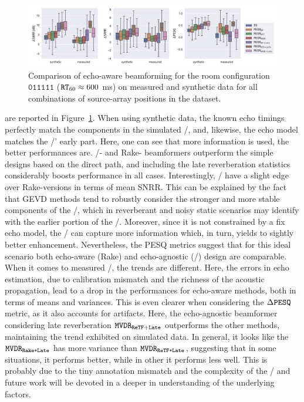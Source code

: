 \begin{figure}[t]
    \begin{fullwidth}
        \centering
        \includegraphics[trim={0 10 10 0},clip,width=\linewidth]{figures/dechorateapp/kowalkzy_results_boxplot.pdf}
        \caption{
        Comparison of echo-aware beamforming for the room configuration $\mathtt{011111}$ ($\mathtt{RT}_{60} \approx 600 $ ms) on measured and synthetic data  for all combinations of source-array positions in the \dEchorate{} dataset.}
        \label{fig:dechorateapp:se:results}
    \end{fullwidth}
\end{figure}

 are reported in Figure~\ref{fig:dechorateapp:se:results}.
When using synthetic data, the known echo timings perfectly match the components in the simulated \RIRs/, and, likewise, the echo model matches the \RIRs/' early part.
Here, one can see that more information is used, the better performances are. \ReTF/- and Rake- beamformers outperform the simple designs based on the direct path, and including the late reverberation statistics considerably boosts performance in all cases.
Interestingly, \ReTF/ have a slight edge over Rake-versions in terms of mean \ac{SNRR}.
This can be explained by the fact that \ac{GEVD} methods tend to robustly consider the stronger and more stable components of the \ReTFs/, which in reverberant and noisy static scenarios may identify with the earlier portion of the \RIRs/.
Moreover, since it is not constrained by a fix echo model, the \ReTFs/ can capture more information which, in turn, yields to sightly better enhancement.
Nevertheless, the \ac{PESQ} metrics suggest that for this ideal scenario  both echo-aware (Rake) and echo-agnostic (\ReTF/) design are comparable.
\\When it comes to measured \RIRs/, the trends are different.
Here, the errors in echo estimation, due to calibration mismatch and the richness of the acoustic propagation, lead to a drop in the performances for echo-aware methods, both in terms of means and variances.
This is even clearer when considering the $\Delta\mathtt{PESQ}$ metric, as it also accounts for artifacts.
Here, the echo-agnostic beamformer considering late reverberation $\mathtt{MVDR}_\mathtt{ReTF+Late}$ outperforms the other methods, maintaining the trend exhibited on simulated data.
In general, it looks like the $\mathtt{MVDR}_\texttt{Rake+Late}$ has more variance than $\mathtt{MVDR}_\texttt{ReTF+Late}$, suggesting that in some situations, it performs better, while in other it performs less well.
This is probably due to the tiny annotation mismatch and the complexity of the \RIRs/ and future work will be devoted in a deeper in understanding of the underlying factors.

